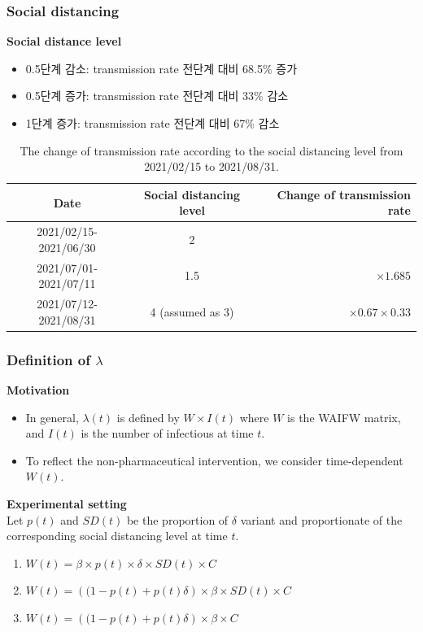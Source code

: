 \documentclass[aspectratio=169, 9pt, xcolor=dvipsnames]{beamer}
\begin{document}
	\begin{frame}\frametitle{Social distancing}
		\textbf{Social distance level}
		\begin{itemize}
			\item 0.5단계 감소: transmission rate 전단계 대비 68.5\% 증가
			\item 0.5단계 증가: transmission rate 전단계 대비 33\% 감소
			\item 1단계 증가: transmission rate 전단계 대비 67\% 감소
		\end{itemize}
	    \begin{table}
	    	\begin{tabular}{ccr}
	    		\toprule
	    		\textbf{Date} & \textbf{Social distancing level} & \textbf{Change of transmission rate} \\
	    		\midrule
	    		2021/02/15-2021/06/30 & 2 &  \\
	    		2021/07/01-2021/07/11 & 1.5 & $\times 1.685$ \\
	    		2021/07/12-2021/08/31 & 4 (assumed as 3) & $\times 0.67 \times 0.33$ \\
	    		\bottomrule
	    	\end{tabular}
	    	\caption{The change of transmission rate according to the social distancing level from 2021/02/15 to 2021/08/31.}
	    \end{table}
	\end{frame}

	\begin{frame}\frametitle{Definition of $\lambda$}
		\textbf{Motivation}
	    \begin{itemize}
	    	\item In general, $\lambda(t)$ is defined by $W \times I(t)$ where $W$ is the WAIFW matrix, and $I(t)$ is the number of infectious at time $t$.
	    	\item To reflect the non-pharmaceutical intervention, we consider time-dependent $W(t)$.
	    \end{itemize}
	    \vspace{0.5cm}
	    \textbf{Experimental setting} \\
	    Let $p(t)$ and $SD(t)$ be the proportion of $\delta$ variant and proportionate of the corresponding social distancing level at time $t$.
	    \begin{enumerate}
	    	\item $W(t) = \beta \times p(t) \times \delta \times SD(t) \times C$
	    	\item $W(t) = \left((1 - p(t) + p(t) \delta\right) \times \beta \times SD(t) \times C$
	    	\item $W(t) = \left((1 - p(t) + p(t) \delta\right) \times \beta \times C$
	    \end{enumerate}
	\end{frame}
\end{document}
